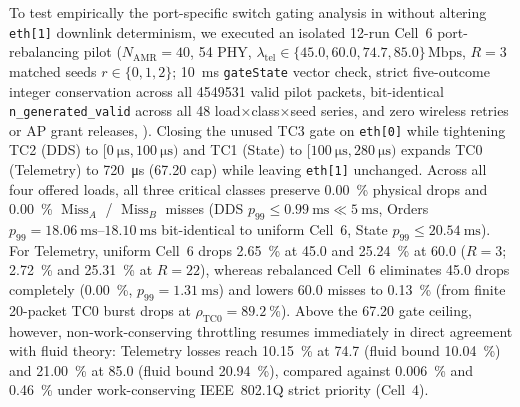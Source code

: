 \documentclass[11pt,a4paper]{article}
\newcommand{\Namr}{\ensuremath{N_{\mathrm{AMR}}}}
\newcommand{\ltel}{\ensuremath{\lambda_{\mathrm{tel}}}}
\newcommand{\MissA}{\ensuremath{\operatorname{Miss}_A}}
\newcommand{\MissB}{\ensuremath{\operatorname{Miss}_B}}
\begin{document}
To test empirically the port-specific switch gating analysis in  without altering \texttt{eth[1]} downlink determinism, we executed an isolated 12-run Cell~6 port-rebalancing pilot ($\Namr=40$, \qty{54}{\mbps} PHY, $\ltel \in \{45.0, 60.0, 74.7, 85.0\}\,\text{Mbps}$, $R=3$ matched seeds $r \in \{0,1,2\}$; \qty{10}{\milli\second} \texttt{gateState} vector check, strict five-outcome integer conservation across all \num{4549531} valid pilot packets, bit-identical \texttt{n\_generated\_valid} across all 48 load$\times$class$\times$seed series, and zero wireless retries or AP grant releases, ). Closing the unused TC3 gate on \texttt{eth[0]} while tightening TC2 (DDS) to $[\qty{0}{\micro\second}, \qty{100}{\micro\second})$ and TC1 (State) to $[\qty{100}{\micro\second}, \qty{280}{\micro\second})$ expands TC0 (Telemetry) to \qty{720}{\micro\second} (\qty{67.20}{\mbps} cap) while leaving \texttt{eth[1]} unchanged. Across all four offered loads, all three critical classes preserve \qty{0.00}{\percent} physical drops and \qty{0.00}{\percent} $\MissA$ / $\MissB$ misses (DDS $p_{99} \le \qty{0.99}{\milli\second} \ll \qty{5}{\milli\second}$, Orders $p_{99} = \qtyrange{18.06}{18.10}{\milli\second}$ bit-identical to uniform Cell~6, State $p_{99} \le \qty{20.54}{\milli\second}$). For Telemetry, uniform Cell~6 drops \qty{2.65}{\percent} at \qty{45.0}{\mbps} and \qty{25.24}{\percent} at \qty{60.0}{\mbps} ($R=3$; \qty{2.72}{\percent} and \qty{25.31}{\percent} at $R=22$), whereas rebalanced Cell~6 eliminates \qty{45.0}{\mbps} drops completely (\qty{0.00}{\percent}, $p_{99} = \qty{1.31}{\milli\second}$) and lowers \qty{60.0}{\mbps} misses to \qty{0.13}{\percent} (from finite 20-packet TC0 burst drops at $\rho_{\mathrm{TC0}}=\qty{89.2}{\percent}$). Above the \qty{67.20}{\mbps} gate ceiling, however, non-work-conserving throttling resumes immediately in direct agreement with fluid theory: Telemetry losses reach \qty{10.15}{\percent} at \qty{74.7}{\mbps} (fluid bound \qty{10.04}{\percent}) and \qty{21.00}{\percent} at \qty{85.0}{\mbps} (fluid bound \qty{20.94}{\percent}), compared against \qty{0.006}{\percent} and \qty{0.46}{\percent} under work-conserving IEEE~802.1Q strict priority (Cell~4).
\end{document}
